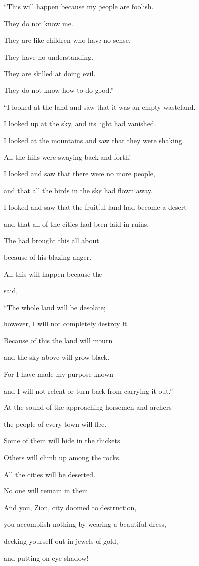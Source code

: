 {\par }{\Q “This will happen because
my people
are foolish.
\par }{\Q They do not
know
me.
\par }{\Q They are like children
who have no sense.
\par }{\Q They have no
understanding.
\par }{\Q They
are skilled
at doing evil.
\par }{\Q They do not
know
how to do good.”
\par }{\Q {}“I looked
at the land
and saw
that it was an empty
wasteland.
\par }{\Q I looked up
at the sky,
and its light
had vanished.
\par }{\Q {}I looked
at the mountains
and saw
that they were shaking.
\par }{\Q All
the hills
were swaying
back and forth!
\par }{\Q {}I looked
and saw
that there
were no
more people,
\par }{\Q and that all
the birds
in the sky
had flown away.
\par }{\Q {}I looked
and saw
that the fruitful land
had become a desert
\par }{\Q and that all
of the cities
had been laid
in ruins.
\par }{\Q The
{}
had brought this all about
\par }{\Q because
of his blazing
anger.
\par }{\Q {}All this
will happen because
the

{}
said,
\par }{\Q “The whole
land
will be desolate;
\par }{\Q however, I will not
completely destroy it.
\par }{\Q {}Because
of this
the land
will mourn
\par }{\Q and the sky
above
will grow black.
\par }{\Q For
I have made
my purpose
known

\par }{\Q and I will not
relent
or
turn back
from carrying it out.”
\par }{\Q {}At the sound
of the approaching
horsemen
and archers
\par }{\Q the people of every
town
will flee.
\par }{\Q Some of them will hide
in the thickets.
\par }{\Q Others will climb
up
among the rocks.
\par }{\Q All
the cities
will be deserted.
\par }{\Q No
one will remain in them.
\par }{\Q {}And you,
Zion, city doomed to destruction,
\par }{\Q you accomplish
nothing by wearing a beautiful
dress,
\par }{\Q decking
yourself out
in jewels
of gold,
\par }{\Q and putting on
eye
shadow!

}
